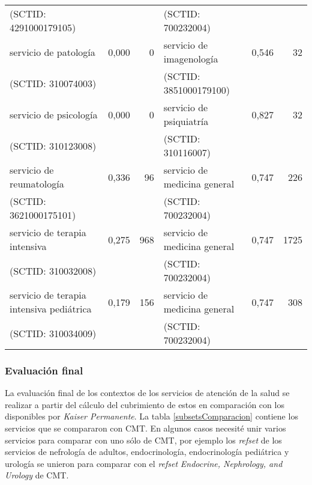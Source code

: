 \begin{table}[htb]
{\begin{tabular}{@{}lrrlrr@{}}
(SCTID: 4291000179105) &&& (SCTID: 700232004)\\
servicio de patología & 0,000 & 0 & servicio de imagenología & 0,546 & 32  \\
(SCTID: 310074003) &&& (SCTID: 3851000179100)\\
servicio de psicología & 0,000 & 0 & servicio de psiquiatría & 0,827 & 32  \\
(SCTID: 310123008) &&& (SCTID: 310116007)\\
servicio de reumatología & 0,336 & 96 & servicio de medicina general & 0,747 & 226  \\
(SCTID: 3621000175101) &&& (SCTID: 700232004)\\
servicio de terapia intensiva & 0,275 & 968 & servicio de medicina general & 0,747 & 1725  \\
(SCTID: 310032008) &&& (SCTID: 700232004)\\
servicio de terapia intensiva pediátrica & 0,179 & 156 & 
servicio de medicina general & 0,747 & 308  \\
(SCTID: 310034009) &&& (SCTID: 700232004)\\
 \bottomrule
\end{tabular}%
}
\end{table}

\subsubsection{Evaluación final}
La evaluación final de los contextos de los servicios de atención de la salud se realizar a partir del cálculo del cubrimiento de estos en comparación con los disponibles por \textit{Kaiser Permanente}. La tabla \ref{subsetsComparacion} contiene los servicios que se compararon con \acrshort{CMT}. En algunos casos necesité unir varios servicios para comparar con uno sólo de \acrshort{CMT}, por ejemplo los \textit{\acrshort{refset}} de los servicios de nefrología de adultos, endocrinología, endocrinología pediátrica y urología se unieron para comparar con el \textit{\acrshort{refset}} \textit{Endocrine, Nephrology, and Urology} de \acrshort{CMT}.

